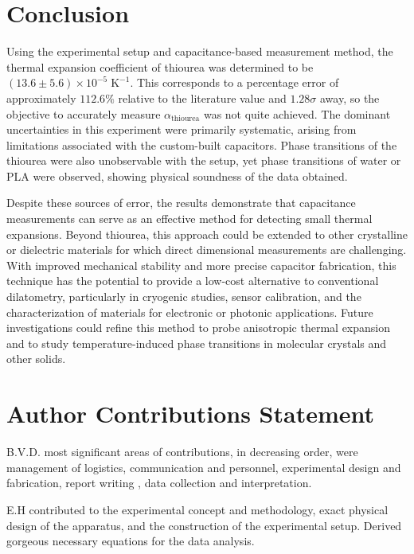 \documentclass[letterpaper,12pt]{article}
\begin{document}
\section{Conclusion}

Using the experimental setup and capacitance-based measurement method, the thermal expansion coefficient of thiourea was determined to be $(13.6 \pm 5.6)\times10^{-5}\; \mathrm{K^{-1}}$.
This corresponds to a percentage error of approximately \(112.6\%\) relative to the literature value and $1.28\sigma$ away, so the objective to accurately measure $\alpha_{\text{thiourea}}$ was not quite achieved. The dominant uncertainties in this experiment were primarily systematic, arising from limitations associated with the custom-built capacitors. Phase transitions of the thiourea were also unobservable with the setup, yet phase transitions of water or PLA were observed, showing physical soundness of the data obtained.

Despite these sources of error, the results demonstrate that capacitance measurements can serve as an effective method for detecting small thermal expansions. Beyond thiourea, this approach could be extended to other crystalline or dielectric materials for which direct dimensional measurements are challenging. With improved mechanical stability and more precise capacitor fabrication, this technique has the potential to provide a low-cost alternative to conventional dilatometry, particularly in cryogenic studies, sensor calibration, and the characterization of materials for electronic or photonic applications. Future investigations could refine this method to probe anisotropic thermal expansion and to study temperature-induced phase transitions in molecular crystals and other solids.

\clearpage
\section*{Author Contributions Statement}

\noindent B.V.D. most significant areas of contributions, in decreasing order, were management of logistics, communication and personnel, experimental design and fabrication, report writing , data collection and interpretation. 

\noindent E.H contributed to the experimental concept and methodology, exact physical design of the apparatus, and the construction of the experimental setup. Derived gorgeous necessary equations for the data analysis.
\end{document}
